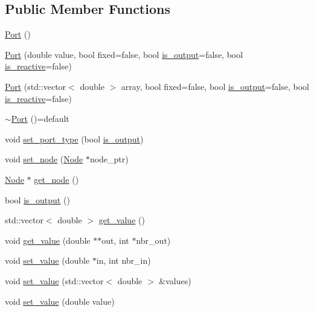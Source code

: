 \subsection*{Public Member Functions}
\begin{DoxyCompactItemize}
\item 
\hyperlink{class_port_a2cfb70a4b6d730e715042d646ec1d960}{Port} ()
\item 
\hyperlink{class_port_abc59e965682f281264a8488a46408a6f}{Port} (double value, bool fixed=false, bool \hyperlink{class_port_a0c7610af582f64a46f25f76f73de804c}{is\+\_\+output}=false, bool \hyperlink{class_port_a1f80bb4edc0bdc8268f4c93ef618bef4}{is\+\_\+reactive}=false)
\item 
\hyperlink{class_port_a7eb1db139cc954b15e0d182ad3244067}{Port} (std\+::vector$<$ double $>$ array, bool fixed=false, bool \hyperlink{class_port_a0c7610af582f64a46f25f76f73de804c}{is\+\_\+output}=false, bool \hyperlink{class_port_a1f80bb4edc0bdc8268f4c93ef618bef4}{is\+\_\+reactive}=false)
\item 
\hyperlink{class_port_aff000f05612ddb41fec4bff9087bb643}{$\sim$\+Port} ()=default
\item 
void \hyperlink{class_port_ab35e1343f0db5a0b258d9541958324bc}{set\+\_\+port\+\_\+type} (bool \hyperlink{class_port_a0c7610af582f64a46f25f76f73de804c}{is\+\_\+output})
\item 
void \hyperlink{class_port_a5dfef60c4b30386e97d2829a23a0d3d3}{set\+\_\+node} (\hyperlink{class_node}{Node} $\ast$node\+\_\+ptr)
\item 
\hyperlink{class_node}{Node} $\ast$ \hyperlink{class_port_a8659a2feee31ada701589c0fb4202b5b}{get\+\_\+node} ()
\item 
bool \hyperlink{class_port_a0c7610af582f64a46f25f76f73de804c}{is\+\_\+output} ()
\item 
std\+::vector$<$ double $>$ \hyperlink{class_port_a82509b87aa9d775d0a40e2b446f2b7ad}{get\+\_\+value} ()
\item 
void \hyperlink{class_port_acc11e1890530dd4bc0b9e3c7778ef5ff}{get\+\_\+value} (double $\ast$$\ast$out, int $\ast$nbr\+\_\+out)
\item 
void \hyperlink{class_port_a18b368a7d48acb802b6671693f54adcb}{set\+\_\+value} (double $\ast$in, int nbr\+\_\+in)
\item 
void \hyperlink{class_port_a664dff6ffb75509465fca1bd89f67ab2}{set\+\_\+value} (std\+::vector$<$ double $>$ \&values)
\item 
void \hyperlink{class_port_a28311c7a8fe9e2838aa8ae63a37d2d9a}{set\+\_\+value} (double value)
$$
\end{DoxyCompactItemize}

